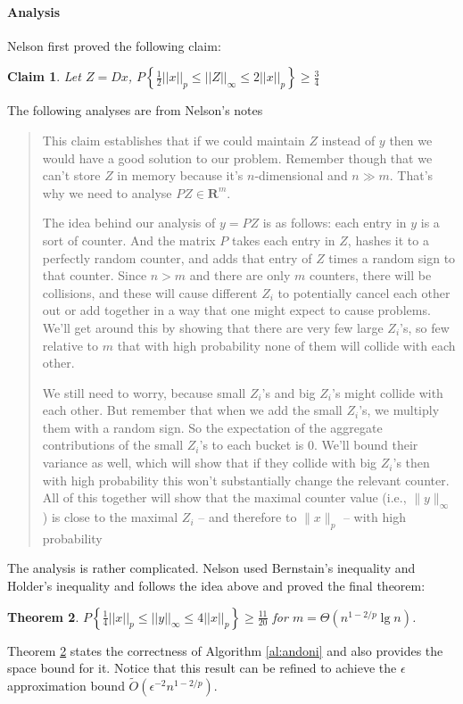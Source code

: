 \documentclass[11pt]{article}
\theoremstyle{plain}
\newtheorem{theorem}{Theorem}[section]
\newtheorem{claim}[theorem]{Claim}
\begin{document}
\paragraph{Analysis} Nelson first proved 
the following claim:
\begin{claim}
	Let $Z=Dx$, $P\left\{ \frac{1}{2}||x||_{p}\le||Z||_{\infty}\le2||x||_{p} 
	\right\}\ge\frac{3}{4}$
\end{claim}
The following analyses are from Nelson's notes \cite{Nel2015-web}
\begin{quotation}
This claim establishes that if we could maintain $Z$ instead of $y$ then we 
would have a good solution to our problem. Remember though that we can't 
store $Z$ in memory because it's $n$-dimensional and $n \gg m$. That's why 
we need to analyse $PZ \in \mathbf{R}^m$.

The idea behind our analysis of $y = PZ$ is as follows: each entry in $y$ is a 
sort of counter. And the matrix $P$ takes each entry in $Z$, hashes it to a 
perfectly random counter, and adds that entry of $Z$ times a random sign to 
that counter. Since $n > m$ and there are only $m$ counters, there will be 
collisions, and these will cause different $Z_i$ to potentially cancel each other 
out or add together in a way that one might expect to cause problems. We'll get 
around this by showing that there are very few large $Z_i$'s, so few relative to 
$m$ that with high probability none of them will collide with each other.

We still need to worry, because small $Z_i$'s and big $Z_i$'s might collide with 
each other. But remember that when we add the small $Z_i$'s, we multiply them 
with a random sign. So the expectation of the aggregate contributions of the 
small $Z_i$'s to each bucket is 0. We'll bound their variance as well, which will 
show that if they collide with big $Z_i$'s then with high probability this won't 
substantially change the relevant counter. All of this together will show that the 
maximal counter value (i.e., $\|y\|_\infty$) is close to the maximal $Z_i$ \--- and 
therefore to $\|x\|_p$ \--- with high probability
\end{quotation}

The analysis is rather complicated. Nelson used Bernstain's inequality and 
Holder's inequality and follows the idea above and proved the final theorem:
\begin{theorem}
		\label{th:andoni}
$P\left\{\frac{1}{4}||x||_{p}\le||y||_{\infty}\le4||x||_{p}\right\}\ge\frac{11}{20}$ for 
$m=\Theta(n^{1-2/p}\lg n)$.
\end{theorem}
Theorem \ref{th:andoni} states the correctness of Algorithm \ref{al:andoni} and 
also provides the space bound for it. Notice that this result can be refined to 
achieve the $\epsilon$ approximation bound  $\tilde{O}(\epsilon^{-2}n^{1-2/p})$.
\end{document}

